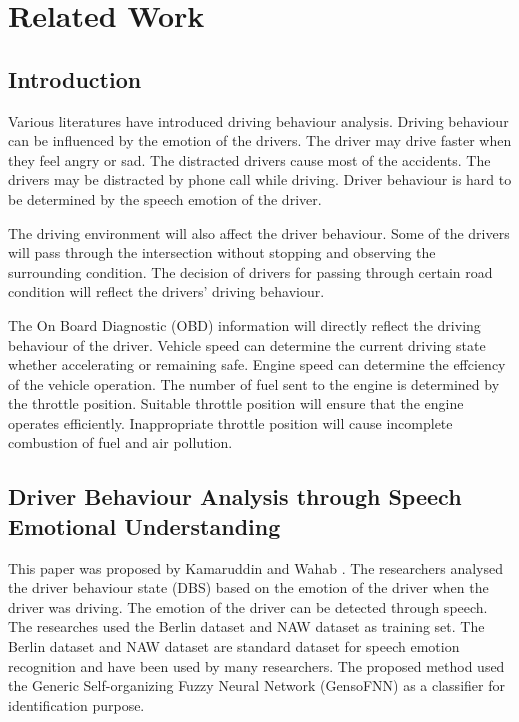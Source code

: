 \chapter{Related Work}
\section{Introduction}
Various literatures have introduced driving behaviour analysis. Driving behaviour can be influenced by the emotion of the drivers. The driver may drive faster when they feel angry or sad. The distracted drivers cause most of the accidents. The drivers may be distracted by phone call while driving. Driver behaviour is hard to be determined by the speech emotion of the driver. \cite{kamaruddin:wahab:2010}

The driving environment will also affect the driver behaviour. Some of the drivers will pass through the intersection without stopping and observing the surrounding condition. The decision of drivers for passing through certain road condition will reflect the drivers' driving behaviour.

The On Board Diagnostic (OBD) information will directly reflect the driving behaviour of the driver. Vehicle speed can determine the current driving state whether accelerating or remaining safe. Engine speed can determine the effciency of the vehicle operation. The number of fuel sent to the engine is determined by the throttle position. Suitable throttle position will ensure that the engine operates efficiently. Inappropriate throttle position will cause incomplete combustion of fuel and air pollution.\cite{chen:pan:lu:2015}   

\section{Driver Behaviour Analysis through Speech Emotional Understanding}
This paper was proposed by Kamaruddin and Wahab \citeyear{kamaruddin:wahab:2010}. The researchers analysed the driver behaviour state (DBS) based on the emotion of the driver when the driver was driving. The emotion of the driver can be detected through speech. 
The researches used the Berlin dataset and NAW dataset as training set. The Berlin dataset and NAW dataset are standard dataset for speech emotion recognition and have been used by many researchers.
The proposed method used the Generic Self-organizing Fuzzy Neural Network (GensoFNN) as a classifier for identification purpose. 
